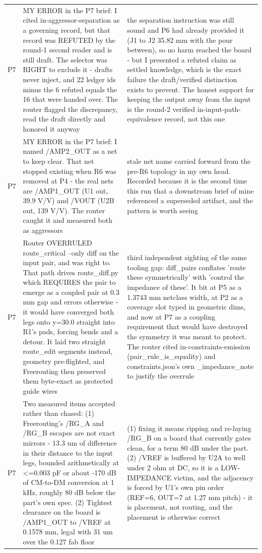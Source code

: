 \documentclass[11pt,a4paper]{article}
\begin{document}
{\begin{longtable}{lp{5.2cm}p{7.2cm}}
P7 & MY ERROR in the P7 brief: I cited in-aggressor-separation as a governing record, but that record was REFUTED by the round-1 second reader and is still draft. The selector was RIGHT to exclude it - drafts never inject, and 22 ledger ids minus the 6 refuted equals the 16 that were handed over. The router flagged the discrepancy, read the draft directly and honored it anyway & the separation instruction was still sound and P6 had already provided it (J1 to J2 35.82 mm with the pour between), so no harm reached the board - but I presented a refuted claim as settled knowledge, which is the exact failure the draft/verified distinction exists to prevent. The honest support for keeping the output away from the input is the round-2 verified in-input-path-equivalence record, not this one \\
P7 & MY ERROR in the P7 brief: I named /AMP2\_OUT as a net to keep clear. That net stopped existing when R6 was removed at P4 - the real nets are /AMP1\_OUT (U1 out, 39.9 V/V) and /VOUT (U2B out, 139 V/V). The router caught it and measured both as aggressors & stale net name carried forward from the pre-R6 topology in my own head. Recorded because it is the second time this run that a downstream brief of mine referenced a superseded artifact, and the pattern is worth seeing \\
P7 & Router OVERRULED route\_critical --only diff on the input pair, and was right to. That path drives route\_diff.py which REQUIRES the pair to emerge as a coupled pair at 0.3 mm gap and errors otherwise - it would have converged both legs onto y=30.0 straight into R1's pads, forcing bends and a detour. It laid two straight route\_edit segments instead, geometry pre-flighted, and Freerouting then preserved them byte-exact as protected guide wires & third independent sighting of the same tooling gap: diff\_pairs conflates 'route these symmetrically' with 'control the impedance of these'. It bit at P5 as a 1.3743 mm netclass width, at P2 as a coverage slot typed in geometric dims, and now at P7 as a coupling requirement that would have destroyed the symmetry it was meant to protect. The router cited in-constraints-emission (pair\_rule\_is\_equality) and constraints.json's own \_impedance\_note to justify the overrule \\
P7 & Two measured items accepted rather than chased: (1) Freerouting's /RG\_A and /RG\_B escapes are not exact mirrors - 13.3 um of difference in their distance to the input legs, bounded arithmetically at \textless{}=0.003 pF or about -170 dB of CM-to-DM conversion at 1 kHz, roughly 80 dB below the part's own spec. (2) Tightest clearance on the board is /AMP1\_OUT to /VREF at 0.1578 mm, legal with 31 um over the 0.127 fab floor & (1) fixing it means ripping and re-laying /RG\_B on a board that currently gates clean, for a term 80 dB under the part. (2) /VREF is buffered by U2A to well under 2 ohm at DC, so it is a LOW-IMPEDANCE victim, and the adjacency is forced by U1's own pin order (REF=6, OUT=7 at 1.27 mm pitch) - it is placement, not routing, and the placement is otherwise correct \\

\end{longtable}}
\end{document}
